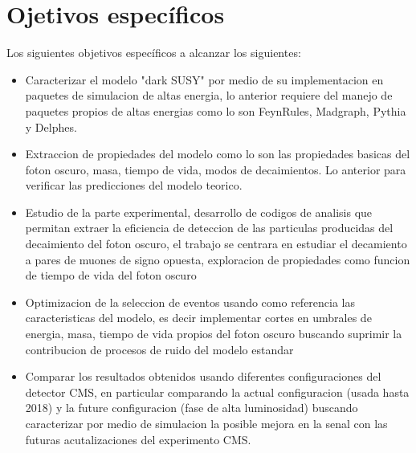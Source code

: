 \chapter{Ojetivos específicos}

Los siguientes objetivos específicos a alcanzar los siguientes:
\begin{itemize}
\item Caracterizar el modelo "dark SUSY" por medio de su implementacion en paquetes de simulacion de altas energia, lo anterior requiere del manejo de paquetes propios de altas energias como lo son FeynRules, Madgraph, Pythia y Delphes.
\item Extraccion de propiedades del modelo como lo son las propiedades basicas del foton oscuro, masa, tiempo de vida, modos de decaimientos. Lo anterior para verificar las
  predicciones del modelo teorico.
\item Estudio de la parte experimental, desarrollo de codigos de analisis que permitan extraer la eficiencia de deteccion de las particulas producidas del decaimiento del foton oscuro, el trabajo se centrara en estudiar el decamiento a pares de muones de signo opuesta, exploracion de propiedades como funcion de tiempo de vida del foton oscuro
\item Optimizacion de la seleccion de eventos usando como referencia las caracteristicas del modelo, es decir implementar cortes en umbrales de energia, masa, tiempo de vida propios del foton oscuro buscando suprimir la contribucion de procesos de ruido del modelo estandar 
\item Comparar los resultados obtenidos usando diferentes configuraciones del detector CMS, en particular comparando la actual configuracion (usada hasta 2018) y la future configuracion (fase de alta luminosidad) buscando caracterizar por medio de simulacion la posible mejora en la senal con las futuras acutalizaciones del experimento CMS. 
\end{itemize}
